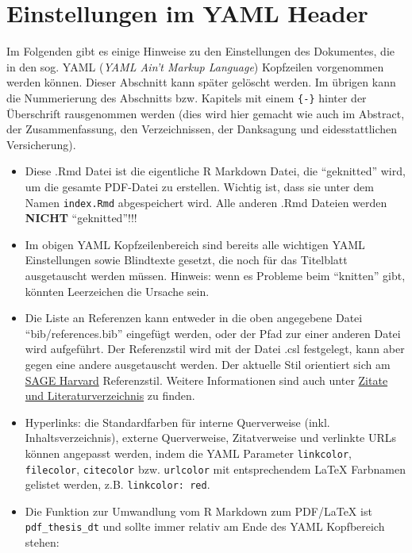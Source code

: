 \documentclass[a4paper,12pt]{article}
\providecommand{\tightlist}{%
  \setlength{\itemsep}{0pt}\setlength{\parskip}{0pt}}
\begin{document}
\newpage
\pagestyle{plain}
\setcounter{page}{1}    		%

\hypertarget{einstellungen-im-yaml-header}{%
\section*{Einstellungen im YAML Header}\label{einstellungen-im-yaml-header}}

Im Folgenden gibt es einige Hinweise zu den Einstellungen des Dokumentes, die in den sog. YAML (\emph{YAML Ain't Markup Language}) Kopfzeilen vorgenommen werden können. Dieser Abschnitt kann später gelöscht werden. Im übrigen kann die Nummerierung des Abschnitts bzw. Kapitels mit einem \texttt{\{-\}} hinter der Überschrift rausgenommen werden (dies wird hier gemacht wie auch im Abstract, der Zusammenfassung, den Verzeichnissen, der Danksagung und eidesstattlichen Versicherung).
\begin{itemize}
\tightlist
\item
  Diese .Rmd Datei ist die eigentliche R Markdown Datei, die \enquote{geknitted} wird, um die gesamte PDF-Datei zu erstellen. Wichtig ist, dass sie unter dem Namen \texttt{index.Rmd} abgespeichert wird. Alle anderen .Rmd Dateien werden \textbf{NICHT} \enquote{geknitted}!!!
\item
  Im obigen YAML Kopfzeilenbereich sind bereits alle wichtigen YAML Einstellungen sowie Blindtexte gesetzt, die noch für das Titelblatt ausgetauscht werden müssen. Hinweis: wenn es Probleme beim \enquote{knitten} gibt, könnten Leerzeichen die Ursache sein.
\item
  Die Liste an Referenzen kann entweder in die oben angegebene Datei \enquote{bib/references.bib} eingefügt werden, oder der Pfad zur einer anderen Datei wird aufgeführt. Der Referenzstil wird mit der Datei .csl festgelegt, kann aber gegen eine andere ausgetauscht werden. Der aktuelle Stil orientiert sich am \href{https://uk.sagepub.com/sites/default/files/sage_harvard_reference_style_0.pdf}{SAGE Harvard} Referenzstil. Weitere Informationen sind auch unter \protect\hyperlink{zitate-und-literaturverzeichnis}{Zitate und Literaturverzeichnis} zu finden.
\item
  Hyperlinks: die Standardfarben für interne Querverweise (inkl. Inhaltsverzeichnis), externe Querverweise, Zitatverweise und verlinkte URLs können angepasst werden, indem die YAML Parameter \texttt{linkcolor}, \texttt{filecolor}, \texttt{citecolor} bzw. \texttt{urlcolor} mit entsprechendem LaTeX Farbnamen gelistet werden, z.B. \texttt{linkcolor:\ red}.
\item
  Die Funktion zur Umwandlung vom R Markdown zum PDF/LaTeX ist \texttt{pdf\_thesis\_dt} und sollte immer relativ am Ende des YAML Kopfbereich stehen:
\end{itemize}
\end{document}
